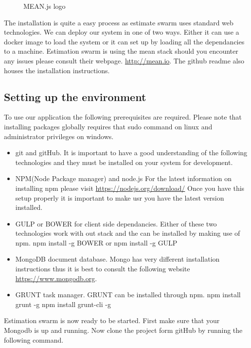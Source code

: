 \begin{figure}[H]
	    	\centering
	    	\caption{MEAN.js logo}
	    	\label{fig:MEAN}
   	\end{figure}
The installation is quite a easy process as estimate swarm uses standard web technologies. We can deploy our system in one of two ways. Either it can use a docker image to load the system or it can set up by loading all the dependancies to a machine. Estimation swarm is using the mean stack should you encounter any issues please consult their webpage. \url{http://mean.io}. The github readme also houses the installation instructions.
\subsection{Setting up the environment}
To use our application the following prerequisites are required. Please note that installing packages globally requires that sudo command on linux and administrator privileges on windows.
\begin{itemize}
	\item git and gitHub. It is important to have a good understanding of the following technologies and they must be installed on your system for development.
	\item NPM(Node Package manager) and node.js 
	For the latest information on installing npm please visit \url{https://nodejs.org/download/} Once you have this setup properly it is important to make usr you have the latest version installed.
	\item GULP or BOWER for client side dependancies.
	Either of these two technologies work with out stack and the can be installed by making use of npm.
	\newline
	npm install -g BOWER or npm install -g GULP 
	\item MongoDB document database. Mongo has very different installation instructions thus it is best to consult the following website \url{https://www.mongodb.org}.
	\item GRUNT task manager. GRUNT can be installed through npm. 
	\newline
	npm install grunt -g
	\newline
	npm install grunt-cli -g
\end{itemize}
Estimation swarm is now ready to be started. First make sure that your Mongodb is up and running. Now clone the project form gitHub by running the following command.
\newline
